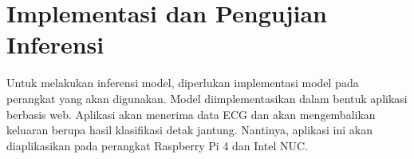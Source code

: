 
\section{Implementasi dan Pengujian Inferensi}
\label{subsec: metodologi-implementasi}

Untuk melakukan inferensi model, diperlukan implementasi model pada perangkat yang akan digunakan.
Model diimplementasikan dalam bentuk aplikasi berbasis web.
Aplikasi akan menerima data ECG dan akan mengembalikan keluaran berupa hasil klasifikasi detak jantung.
Nantinya, aplikasi ini akan diaplikasikan pada perangkat Raspberry Pi 4 dan Intel NUC.





